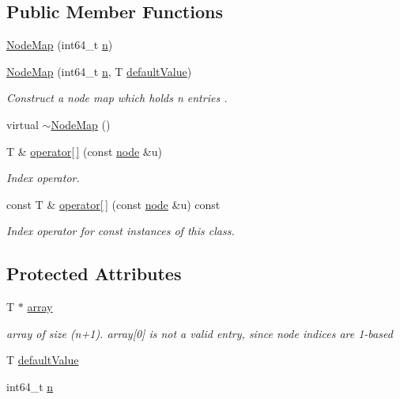 \subsection*{Public Member Functions}
\begin{DoxyCompactItemize}
\item 
\hyperlink{class_ensemble_clustering_1_1_node_map_aab4cdeacb9053e3af1e85c8610bc81c1}{Node\-Map} (int64\-\_\-t \hyperlink{class_ensemble_clustering_1_1_node_map_a511baf014428ed1dece45d9ab94f205b}{n})
\item 
\hyperlink{class_ensemble_clustering_1_1_node_map_ab5f347c8b015b0c2efc3750a7d4e0762}{Node\-Map} (int64\-\_\-t \hyperlink{class_ensemble_clustering_1_1_node_map_a511baf014428ed1dece45d9ab94f205b}{n}, T \hyperlink{class_ensemble_clustering_1_1_node_map_a79da6a77072605a77c060bbb2e5a620c}{default\-Value})
\begin{DoxyCompactList}\small\item\em Construct a node map which holds n entries . \end{DoxyCompactList}\item 
virtual \hyperlink{class_ensemble_clustering_1_1_node_map_ad362216773b1f778db051309ecfb5c99}{$\sim$\-Node\-Map} ()
\item 
T \& \hyperlink{class_ensemble_clustering_1_1_node_map_aebc1eed243771ab969c08dc4ab73e12b}{operator\mbox{[}$\,$\mbox{]}} (const \hyperlink{namespace_ensemble_clustering_ae829290aeccd1a420b17a37fd901f114}{node} \&u)
\begin{DoxyCompactList}\small\item\em Index operator. \end{DoxyCompactList}\item 
const T \& \hyperlink{class_ensemble_clustering_1_1_node_map_a7a39722236380fd5879370351d0c177a}{operator\mbox{[}$\,$\mbox{]}} (const \hyperlink{namespace_ensemble_clustering_ae829290aeccd1a420b17a37fd901f114}{node} \&u) const 
\begin{DoxyCompactList}\small\item\em Index operator for const instances of this class. \end{DoxyCompactList}\end{DoxyCompactItemize}
\subsection*{Protected Attributes}
\begin{DoxyCompactItemize}
\item 
T $\ast$ \hyperlink{class_ensemble_clustering_1_1_node_map_a07b1d885793627c3691beeb5dca28717}{array}
\begin{DoxyCompactList}\small\item\em array of size (n+1). array\mbox{[}0\mbox{]} is not a valid entry, since node indices are 1-\/based \end{DoxyCompactList}\item 
T \hyperlink{class_ensemble_clustering_1_1_node_map_a79da6a77072605a77c060bbb2e5a620c}{default\-Value}
\item 
int64\-\_\-t \hyperlink{class_ensemble_clustering_1_1_node_map_a511baf014428ed1dece45d9ab94f205b}{n}
\end{DoxyCompactItemize}


